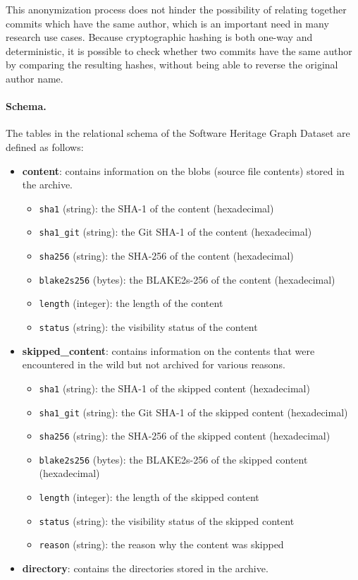 This anonymization process does not hinder the possibility of relating together
commits which have the same author, which is an important need in many research
use cases. Because cryptographic hashing is both one-way and deterministic, it
is possible to check whether two commits have the same author by comparing the
resulting hashes, without being able to reverse the original author name.

\paragraph*{Schema.}
The tables in the relational schema of the Software Heritage Graph Dataset are
defined as follows:


\begin{itemize}
\item
  \textbf{content}: contains information on the blobs (source file contents) stored in the
  archive.

  \begin{itemize}
  \tightlist
  \item
    \texttt{sha1} (string): the SHA-1 of the content (hexadecimal)
  \item
    \texttt{sha1\_git} (string): the Git SHA-1 of the content
    (hexadecimal)
  \item
    \texttt{sha256} (string): the SHA-256 of the content (hexadecimal)
  \item
    \texttt{blake2s256} (bytes): the BLAKE2s-256 of the content
    (hexadecimal)
  \item
    \texttt{length} (integer): the length of the content
  \item
    \texttt{status} (string): the visibility status of the content
  \end{itemize}
\item
  \textbf{skipped\_content}: contains information on the contents that
  were encountered in the wild but not archived for various reasons.

  \begin{itemize}
  \tightlist
  \item
    \texttt{sha1} (string): the SHA-1 of the skipped content
    (hexadecimal)
  \item
    \texttt{sha1\_git} (string): the Git SHA-1 of the skipped content
    (hexadecimal)
  \item
    \texttt{sha256} (string): the SHA-256 of the skipped content
    (hexadecimal)
  \item
    \texttt{blake2s256} (bytes): the BLAKE2s-256 of the skipped content
    (hexadecimal)
  \item
    \texttt{length} (integer): the length of the skipped content
  \item
    \texttt{status} (string): the visibility status of the skipped
    content
  \item
    \texttt{reason} (string): the reason why the content was skipped
  \end{itemize}
\item
  \textbf{directory}: contains the directories stored in the archive.


\end{itemize}
